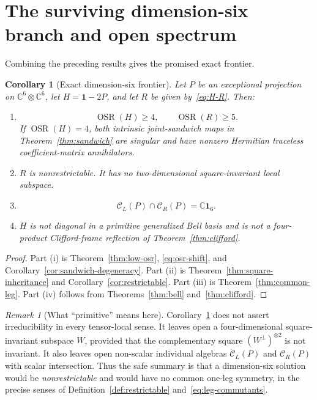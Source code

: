 \documentclass[11pt]{article}
\newtheorem{corollary}[theorem]{Corollary}
\theoremstyle{definition}
\theoremstyle{remark}
\newtheorem{remark}[theorem]{Remark}
\newcommand{\Id}{\mathbf 1}
\newcommand{\OSR}{\operatorname{OSR}}
\newcommand{\bbC}{\mathbb C}
\newcommand{\cC}{\mathcal C}
\begin{document}
\section{The surviving dimension-six branch and open spectrum}
\label{sec:surviving-branch}

Combining the preceding results gives the promised exact frontier.

\begin{corollary}[Exact dimension-six frontier]
\label{cor:d6-frontier}
Let \(P\) be an exceptional projection on
\(\bbC^6\otimes\bbC^6\), let \(H=\Id-2P\), and let \(R\) be given
by~\eqref{eq:H-R}. Then:
\begin{enumerate}[label=\textup{(\roman*)}]
\item
\[
  \OSR(H)\ge4,\qquad \OSR(R)\ge5.
\]
If \(\OSR(H)=4\), both intrinsic joint-sandwich maps in
Theorem~\ref{thm:sandwich} are singular and have nonzero Hermitian
traceless coefficient-matrix annihilators.
\item \(R\) is nonrestrictable. It has no two-dimensional
square-invariant local subspace.
\item
\[
  \cC_L(P)\cap\cC_R(P)=\bbC\Id_6.
\]
\item \(H\) is not diagonal in a primitive generalized Bell basis and is
not a four-product Clifford-frame reflection of
Theorem~\ref{thm:clifford}.
\end{enumerate}
\end{corollary}

\begin{proof}
Part (i) is Theorem~\ref{thm:low-osr},
\eqref{eq:osr-shift}, and
Corollary~\ref{cor:sandwich-degeneracy}. Part (ii) is
Theorem~\ref{thm:square-inheritance} and
Corollary~\ref{cor:restrictable}. Part (iii) is
Theorem~\ref{thm:common-leg}. Part (iv) follows from
Theorems~\ref{thm:bell} and~\ref{thm:clifford}.
\end{proof}

\begin{remark}[What ``primitive'' means here]
\label{rem:primitive-word}
Corollary~\ref{cor:d6-frontier} does not assert irreducibility in every
tensor-local sense. It leaves open a four-dimensional square-invariant
subspace \(W\), provided that the complementary square
\((W^\perp)^{\otimes2}\) is not invariant. It also leaves open non-scalar
individual algebras \(\cC_L(P)\) and \(\cC_R(P)\) with scalar
intersection. Thus the safe summary is that a dimension-six solution
would be \emph{nonrestrictable} and would have no common one-leg
symmetry, in the precise senses of
Definition~\ref{def:restrictable} and~\eqref{eq:leg-commutants}.
\end{remark}
\end{document}
